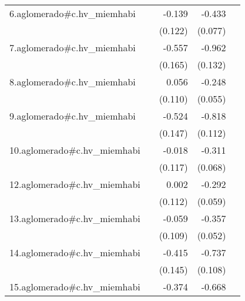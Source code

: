 {\begin{longtable}{l*{4}{D{.}{.}{-1}}}
\addlinespace
6.aglomerado#c.hv\_miemhabi&                     &      -0.139         &      -0.433\sym{***}&                     \\
            &                     &     (0.122)         &     (0.077)         &                     \\
\addlinespace
7.aglomerado#c.hv\_miemhabi&                     &      -0.557\sym{***}&      -0.962\sym{***}&                     \\
            &                     &     (0.165)         &     (0.132)         &                     \\
\addlinespace
8.aglomerado#c.hv\_miemhabi&                     &       0.056         &      -0.248\sym{***}&                     \\
            &                     &     (0.110)         &     (0.055)         &                     \\
\addlinespace
9.aglomerado#c.hv\_miemhabi&                     &      -0.524\sym{***}&      -0.818\sym{***}&                     \\
            &                     &     (0.147)         &     (0.112)         &                     \\
\addlinespace
10.aglomerado#c.hv\_miemhabi&                     &      -0.018         &      -0.311\sym{***}&                     \\
            &                     &     (0.117)         &     (0.068)         &                     \\
\addlinespace
12.aglomerado#c.hv\_miemhabi&                     &       0.002         &      -0.292\sym{***}&                     \\
            &                     &     (0.112)         &     (0.059)         &                     \\
\addlinespace
13.aglomerado#c.hv\_miemhabi&                     &      -0.059         &      -0.357\sym{***}&                     \\
            &                     &     (0.109)         &     (0.052)         &                     \\
\addlinespace
14.aglomerado#c.hv\_miemhabi&                     &      -0.415\sym{**} &      -0.737\sym{***}&                     \\
            &                     &     (0.145)         &     (0.108)         &                     \\
\addlinespace
15.aglomerado#c.hv\_miemhabi&                     &      -0.374\sym{**} &      -0.668\sym{***}&                     \\

\end{longtable}}
